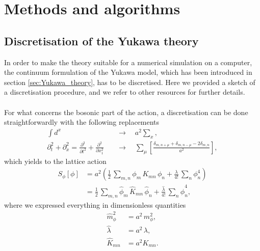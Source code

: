 
\chapter{Methods and algorithms}
\label{chapt:methods}

\section{Discretisation of the Yukawa theory}
\label{sec:lattice_discretisation}
In order to make the theory suitable for a numerical simulation on a computer, the continuum formulation of the Yukawa model, which has been introduced in section \ref{sec:Yukawa_theory}, has to be discretised. Here we provided a sketch of a discretisation procedure, and we refer to other resources \cite{rothe_LGT,gattringer_LQCD,creutz_2023,Montvay1994QuantumLattice} for further details. \\~\\
For what concerns the bosonic part of the action, a discretisation can be done straightforwardly with the following replacements
\begin{equation*}
    \begin{aligned}
        \int d^x \quad &\to \quad a^2 \sum_x, \\
        \partial^2_t + \partial^2_x = \frac{\partial^2}{\partial t^2} + \frac{\partial^2}{\partial x_1^2} \quad &\to \quad \sum_\mu \left[\frac{\delta_{m,n+\mu} + \delta_{m,n-\mu} - 2 \delta_{m,n}}{a^2}\right],
    \end{aligned}
\end{equation*}
which yields to the lattice action
\begin{equation*}
        \begin{aligned} 
        		S_\phi [\phi] 	&=  a^2 \left( \frac{1}{2} \, \sum_{m,n} \phi_m \, K_{mn} \, \phi_n + \frac{\lambda}{4!} \, \sum_n \phi_n^4 \right)\\
        					&=  \frac{1}{2} \, \sum_{m,n} \hat{\phi}_m \, \widehat{K}_{mn} \, \hat{\phi}_n + \frac{\hat{\lambda}}{4!} \, \sum_n \hat{\phi}_n^4,
	\end{aligned}
\end{equation*}
where we expressed everything in dimensionless quantities
\begin{equation}
    \begin{aligned}
        \hat m_\phi^2 &= a^2 \, m_\phi^2, \\
        \hat \lambda &= a^{2} \, \lambda, \\
        \widehat{K}_{mn} &= a^2 K_{mn}.
    \end{aligned}
    \label{eq:couplings_redefitinion}
\end{equation}
